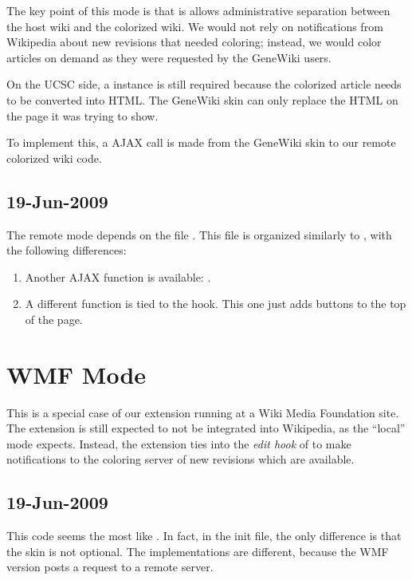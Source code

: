 The key point of this mode is that is allows administrative separation
between the host wiki and the colorized wiki.
We would not rely on notifications from Wikipedia about new revisions
that needed coloring; instead, we would color articles
on demand as they were requested by the GeneWiki users.

On the UCSC side, a  instance is still required
because the colorized article needs to be converted into HTML.
The GeneWiki skin can only replace the HTML on the page it was
trying to show.

To implement this, a  AJAX call is made
from the GeneWiki skin to our remote colorized wiki code.

\subsection{19-Jun-2009}

The remote mode depends on the file .
This file is organized similarly to ,
with the following differences:
\begin{enumerate}
\item Another AJAX function is available: .
\item A different function is tied to the  hook.  This one just adds buttons to the top of the page.
\end{enumerate}

\section{WMF Mode}

This is a special case of our extension running at a Wiki Media Foundation site.
The extension is still expected to not be integrated into Wikipedia,
as the ``local'' mode expects.
Instead, the extension ties into the \textit{edit hook} of
 to make notifications to the coloring server
of new revisions which are available.

\subsection{19-Jun-2009}

This code seems the most like .
In fact, in the init file, the only difference is that the skin is not optional.
The implementations are different, because the WMF version posts
a request to a remote server.

